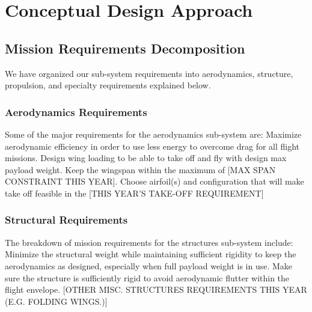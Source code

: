 
\section{Conceptual Design Approach} %
\label{sec:ConceptualDesign}



\subsection{Mission Requirements Decomposition}
\label{ssec:MissionReqs}

We have organized our sub-system requirements into aerodynamics, structure, propulsion, and specialty requirements explained below.

\subsubsection{Aerodynamics Requirements}
\label{sssec:AerodynamicReqs}

Some of the major requirements for the aerodynamics sub-system are: Maximize aerodynamic efficiency in order to use less energy to overcome drag for all flight missions.  Design wing loading to be able to take off and fly with design max payload weight.  Keep the wingspan within the maximum of {\color{BYUred}[MAX SPAN CONSTRAINT THIS YEAR]}.  Choose airfoil(s) and configuration that will make take off feasible in the {\color{BYUred}[THIS YEAR'S TAKE-OFF REQUIREMENT]}

\subsubsection{Structural Requirements}
\label{sssec:StructuralReqs}

The breakdown of mission requirements for the structures sub-system include: Minimize the structural weight while maintaining sufficient rigidity to keep the aerodynamics as designed, especially when full payload weight is in use.  Make sure the structure is sufficiently rigid to avoid aerodynamic flutter within the flight envelope. {\color{BYUred}[OTHER MISC. STRUCTURES REQUIREMENTS THIS YEAR (E.G. FOLDING WINGS.)]}

